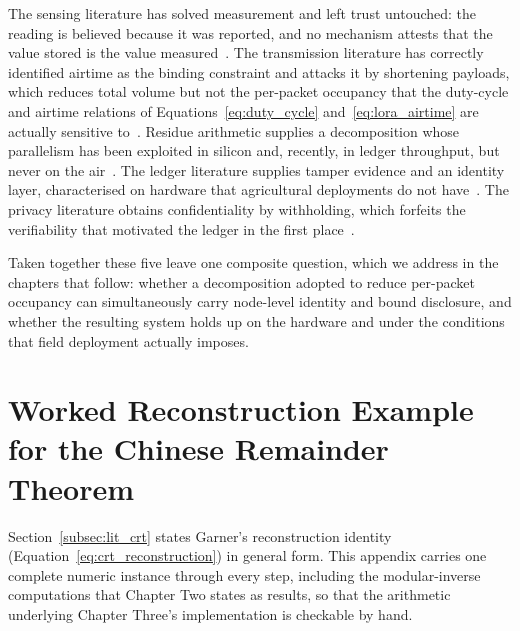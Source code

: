 \documentclass[12pt,a4paper,oneside]{book}
\begin{document}
The sensing literature has solved measurement and left trust untouched: the
reading is believed because it was reported, and no mechanism attests that the
value stored is the value measured~\cite{soussi2024smartsensors, aydin2021comprehensive}. The transmission literature has correctly identified
airtime as the binding constraint and attacks it by shortening payloads, which
reduces total volume but not the per-packet occupancy that
the duty-cycle and airtime relations of Equations~\ref{eq:duty_cycle}
and~\ref{eq:lora_airtime} are actually sensitive to~\cite{marcelloni2009energy, chen2025compression}. Residue arithmetic
supplies a decomposition whose parallelism has been exploited in silicon and,
recently, in ledger throughput, but never on the
air~\cite{parhami2010computer, luo2023researchapplication, maiwada2025blockchainscalability}. The ledger literature supplies tamper
evidence and an identity layer, characterised on hardware that agricultural
deployments do not have~\cite{tar2023fabric, zulkarnain2025performancebenchmarking}. The privacy literature obtains
confidentiality by withholding, which forfeits the verifiability that motivated
the ledger in the first place~\cite{kormiltsyn2023privacyconflict, yousif2026enablingprivacy}.

Taken together these five leave one composite question, which we address in
the chapters that follow: whether a decomposition adopted to reduce per-packet
occupancy can simultaneously carry node-level identity and bound disclosure,
and whether the resulting system holds up on the hardware and under the
conditions that field deployment actually imposes.
\clearpage{}


\backmatter

\begin{singlespace}
\printbibliography[heading=none]
\end{singlespace}

\appendix
\renewcommand{\thechapterword}{\thechapter}
\makeatletter\global\@mainmattertrue\makeatother
\clearpage{}

\chapter{Worked Reconstruction Example for the Chinese Remainder Theorem}
\label{app:crt_worked}

Section~\ref{subsec:lit_crt} states Garner's reconstruction identity
(Equation~\ref{eq:crt_reconstruction}) in general form. This appendix
carries one complete numeric instance through every step, including the
modular-inverse computations that Chapter Two states as results, so that
the arithmetic underlying Chapter Three's implementation is checkable by
hand.
\end{document}
